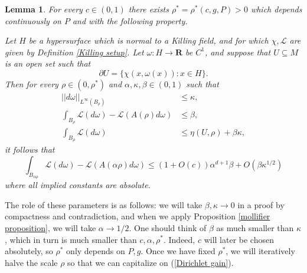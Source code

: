 \documentclass[reqno,12pt,letterpaper]{amsart}
\newcommand{\RR}{\mathbf{R}}
\newcommand{\Lagrange}{\mathscr L}
\newtheorem{lemma}[theorem]{Lemma}
\theoremstyle{definition}
\numberwithin{equation}{section}
\begin{document}
\begin{lemma}
For every $c \in (0, 1)$ there exists $\rho^* = \rho^*(c, g, P) > 0$ which depends continuously on $P$ and with the following property.

Let $H$ be a hypersurface which is normal to a Killing field, and for which $\chi,\Lagrange$ are given by Definition \ref{Killing setup}.
Let $\omega: H \to \RR$ be $C^1$, and suppose that $U \subseteq M$ is an open set such that
$$\partial U = \{\chi(x, \omega(x)): x \in H\}.$$
Then for every $\rho \in (0, \rho^*)$ and $\alpha, \kappa, \beta \in (0, 1)$ such that
\begin{align}
||d\omega||_{L^\infty(B_\rho)} &\leq \kappa, \label{Dirichlet small derivative}\\
\int_{B_\rho} \Lagrange(d\omega) - \Lagrange(A(\rho)d\omega) &\leq \beta, \label{Dirichlet close to mean} \\
\int_{B_\rho} \Lagrange(d\omega) &\leq \eta(U, \rho) + \beta \kappa, \label{Dirichlet close to minimal}
\end{align}
it follows that
\begin{equation}\label{Dirichlet gain}
\int_{B_{\alpha\rho}} \Lagrange(d\omega) - \Lagrange(A(\alpha\rho)d\omega) \leq (1 + O(c))\alpha^{d + 1}\beta + O(\beta \kappa^{1/2})
\end{equation}
where all implied constants are absolute.
\end{lemma}
The role of these parameters is as follows: we will take $\beta,\kappa \to 0$ in a proof by compactness and contradiction, and when we apply Proposition \ref{mollifier proposition}, we will take $\alpha \to 1/2$. One should think of $\beta$ as much smaller than $\kappa$, which in turn is much smaller than $c,\alpha,\rho^*$.
Indeed, $c$ will later be chosen absolutely, so $\rho^*$ only depends on $P,g$.
Once we have fixed $\rho^*$, we will iteratively halve the scale $\rho$ so that we can capitalize on (\ref{Dirichlet gain}).
\end{document}
